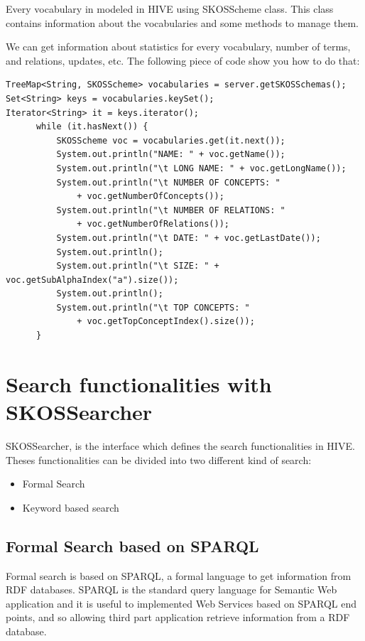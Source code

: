 Every vocabulary in modeled in HIVE using SKOSScheme class. This class contains information about the vocabularies 
and some methods to manage them.

We can get information about statistics for every vocabulary, number of terms, and relations, updates, etc. The following piece of code show you how to do that:

\begin{verbatim}
TreeMap<String, SKOSScheme> vocabularies = server.getSKOSSchemas();
Set<String> keys = vocabularies.keySet();
Iterator<String> it = keys.iterator();
	  while (it.hasNext()) {
		  SKOSScheme voc = vocabularies.get(it.next());
		  System.out.println("NAME: " + voc.getName());
		  System.out.println("\t LONG NAME: " + voc.getLongName());
		  System.out.println("\t NUMBER OF CONCEPTS: "
		      + voc.getNumberOfConcepts());
		  System.out.println("\t NUMBER OF RELATIONS: "
		      + voc.getNumberOfRelations());
		  System.out.println("\t DATE: " + voc.getLastDate());
		  System.out.println();
		  System.out.println("\t SIZE: " + voc.getSubAlphaIndex("a").size());
		  System.out.println();
		  System.out.println("\t TOP CONCEPTS: "
		      + voc.getTopConceptIndex().size());
	  }
\end{verbatim}


\section{Search functionalities with SKOSSearcher}

SKOSSearcher, is the interface which defines the search functionalities in HIVE. Theses functionalities can be divided into two different 
kind of search:

\begin{itemize}
 \item Formal Search
 \item Keyword based search
\end{itemize}

\subsection{Formal Search based on SPARQL}

Formal search is based on SPARQL, a formal language to get information from RDF databases. SPARQL is the standard query language for 
Semantic Web application and it is useful to implemented Web Services based on SPARQL end points, and so allowing third part application 
retrieve information from a RDF database.

